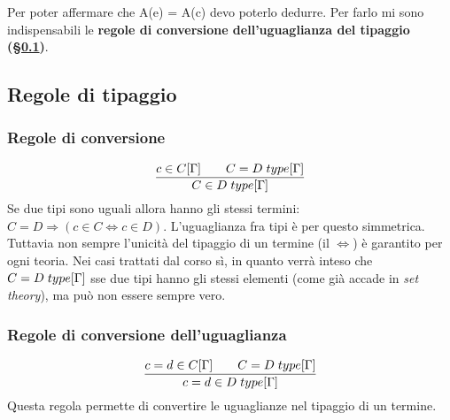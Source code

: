 \documentclass[10pt,a4paper, italian]{book}
\begin{document}
{{\begin{prooftree}
\end{prooftree}
\noindent
Per poter affermare che A(e) = A(c) devo poterlo dedurre. Per farlo mi sono indispensabili le \textbf{regole di conversione dell'uguaglianza del tipaggio (\S\ref{subsec:regole-tipaggio})}.

\subsection{Regole di tipaggio}
\label{subsec:regole-tipaggio}

\subsubsection{Regole di conversione}
\label{subsubsec:regole-di-conversione}
\[\frac{c \in C[\Gamma] \qquad C = D\hspace{0.1cm}type[\Gamma]}{C \in D\hspace{0.1cm}type [\Gamma]}\]
Se due tipi sono uguali allora hanno gli stessi termini: $C=D \Rightarrow (c \in C \Leftrightarrow c \in D)$. L'uguaglianza fra tipi \`e per questo simmetrica.\\
Tuttavia non sempre l'unicit\`a del tipaggio di un termine (il $\Leftrightarrow$) \`e garantito per ogni teoria. Nei casi trattati dal corso s\`i, in quanto verr\`a inteso che $C = D\hspace{0.1cm}type[\Gamma]$ sse due tipi hanno gli stessi elementi (come gi\`a accade in \textit{set theory}), ma pu\`o non essere sempre vero.

\subsubsection{Regole di conversione dell'uguaglianza}
\label{subsubsec:regole-di-conversione-uguaglianza}
\[\frac{c=d \in C[\Gamma] \qquad C = D\hspace{0.1cm}type[\Gamma]}{c = d \in D \hspace{0.1cm} type [\Gamma]}\]
Questa regola permette di convertire le uguaglianze nel tipaggio di un termine.


}}
\end{document}
